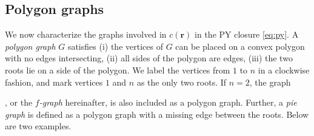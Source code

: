\documentclass[preprint]{revtex4-1}
\newcommand{\vct}[1]{\mathbf{#1}}
\providecommand{\vr}{} %
\renewcommand{\vr}{\vct{r}}
\begin{document}
\subsection{Polygon graphs}



We now characterize the graphs involved in $c(\vr)$
  in the PY closure \eqref{eq:py}.
%
A \emph{polygon graph} $G$ satisfies
  (i) the vertices of $G$ can be placed
  on a convex polygon
  with no edges intersecting,
  (ii) all sides of the polygon are edges,
  (iii) the two roots lie on a side of the polygon. %
%
We label the vertices from $1$ to $n$ in a clockwise fashion,
  and mark vertices $1$ and $n$ as the only two roots.
%
If $n = 2$, the graph
  ,
  or the \emph{$f$-graph} hereinafter,
  is also included as a polygon graph.
%
Further,
  a \emph{pie graph}
  is defined as
  a polygon graph with a missing edge between the roots.
%
Below are two examples.
%
\end{document}
